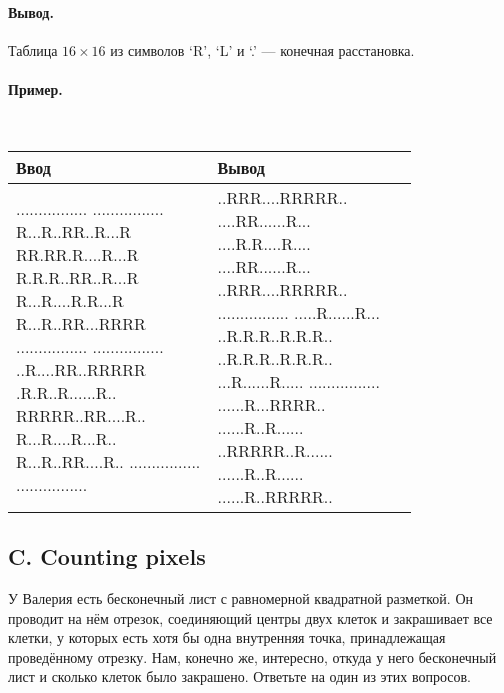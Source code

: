 \documentclass[12pt, a4paper]{article}
\newcommand{\outformat}[1]
{
	\paragraph{Вывод.\\} #1
}
\newcommand{\example}[2]
{
	\paragraph{Пример.\\}
	{\tt
	\begin{tabular}{|p{0.4\linewidth}|p{0.4\linewidth}|}
	\hline
	Ввод & Вывод \\
	\hline
	#1 & #2		\\
	\hline
	\end{tabular}
	}
}
\begin{document}
\outformat{Таблица $16 \times 16$  из символов ‘R’, ‘L’ и ‘.’ --- конечная расстановка.}

\example{
................\newline
................\newline
R...R..RR..R...R\newline
RR.RR.R....R...R\newline
R.R.R..RR..R...R\newline
R...R....R.R...R\newline
R...R..RR...RRRR\newline
................\newline
................\newline
..R....RR..RRRRR\newline
.R.R..R......R..\newline
RRRRR..RR....R..\newline
R...R....R...R..\newline
R...R..RR....R..\newline
................\newline
................
}{
..RRR....RRRRR..\newline
....RR......R...\newline
....R.R....R....\newline
....RR......R...\newline
..RRR....RRRRR..\newline
................\newline
.....R......R...\newline
..R.R.R..R.R.R..\newline
..R.R.R..R.R.R..\newline
...R......R.....\newline
................\newline
......R...RRRR..\newline
......R..R......\newline
..RRRRR..R......\newline
......R..R......\newline
......R..RRRRR..
}

\newpage

\subsection*{C. Counting pixels}

У Валерия есть бесконечный лист с равномерной квадратной разметкой. Он проводит на нём отрезок, соединяющий центры двух клеток и закрашивает все клетки, у которых есть хотя бы одна внутренняя точка, принадлежащая проведённому отрезку. Нам, конечно же, интересно, откуда у него бесконечный лист и сколько клеток было закрашено. Ответьте на один из этих вопросов.
 
\end{document}

